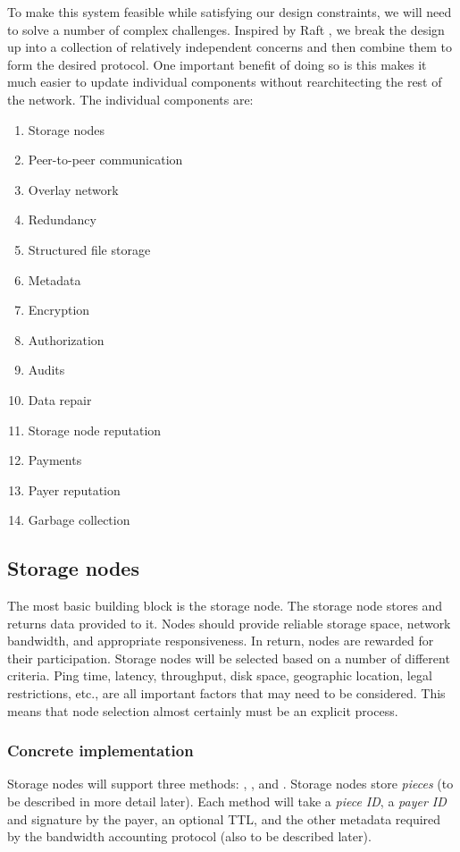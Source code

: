 \documentclass[a4paper,10pt]{article} \usepackage[utf8]{inputenc}
\begin{document}
To make this system feasible while satisfying our design constraints, we will
need to solve a number of complex challenges. Inspired by Raft \cite{raft}, we
break the design up into a collection of relatively independent concerns and
then combine them to form the desired protocol. One important benefit of doing
so is this makes it much easier to update individual components without
rearchitecting the rest of the network. The individual components are:

\begin{enumerate}
\item Storage nodes
\item Peer-to-peer communication
\item Overlay network
\item Redundancy
\item Structured file storage
\item Metadata
\item Encryption
\item Authorization
\item Audits
\item Data repair
\item Storage node reputation
\item Payments
\item Payer reputation
\item Garbage collection
\end{enumerate}

\subsection{Storage nodes}

The most basic building block is the storage node. The storage node stores and
returns data provided to it. Nodes should provide reliable storage space,
network bandwidth, and appropriate responsiveness. In return, nodes are rewarded
for their participation. Storage nodes will be selected based on a number of
different criteria. Ping time, latency, throughput, disk space, geographic
location, legal restrictions, etc., are all important factors that may need to
be considered. This means that node selection almost certainly must be an
explicit process.

\subsubsection{Concrete implementation}

Storage nodes will support three methods: , , and
. Storage nodes store {\em pieces} (to be described in more detail
later). Each method will take a {\em piece ID}, a {\em payer ID} and signature
by the payer, an optional TTL, and the other metadata required by the bandwidth
accounting protocol (also to be described later).
\end{document}
